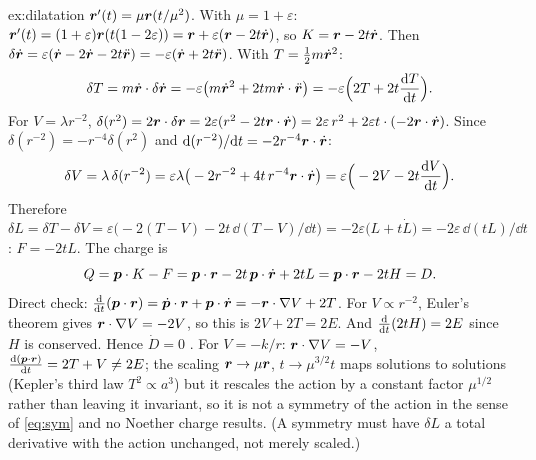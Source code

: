 \documentclass[11pt]{article}
\newcommand{\eps}{\varepsilon}
\begin{document}
\begin{solution}{ex:dilatation}
$\bm{r}'(t)=\mu\bm{r}(t/\mu^2)$. With $\mu=1+\eps$: $\vect r'(t)=(1+\eps)\vect r(t(1-2\eps))=\vect r+\eps(\vect r-2t\dot{\vect r})$, so $K=\bm{r}-2t\dot{\bm{r}}$. Then $\delta\dot{\vect r}=\eps(\dot{\vect r}-2\dot{\vect r}-2t\ddot{\vect r})=-\eps(\dot{\vect r}+2t\ddot{\vect r})$. With $T=\tfrac12m\dot{\bm{r}}^2$:
\begin{equation}
  \delta T=m\dot{\vect r}\cdot\delta\dot{\vect r}=-\eps\big(m\dot{\vect r}^2+2tm\dot{\vect r}\cdot\ddot{\vect r}\big)=-\eps\Big(2T+2t\diff Tt\Big).
\end{equation}
For $V=\lambda r^{-2}$, $\delta(r^2)=2\vect r\cdot\delta\vect r=2\eps(r^2-2t\vect r\cdot\dot{\vect r})=2\eps\,r^2+2\eps t\cdot(-2\vect r\cdot\dot{\vect r})$. Since $\delta(r^{-2})=-r^{-4}\delta(r^2)$ and $\mathrm{d}(r^{-2})/\mathrm{d} t=-2r^{-4}\bm{r}\cdot\dot{\bm{r}}$:
\begin{equation}
  \delta V=\lambda\,\delta(r^{-2})=\eps\lambda\big(-2r^{-2}+4t\,r^{-4}\vect r\cdot\dot{\vect r}\big)=\eps\Big(-2V-2t\diff Vt\Big).
\end{equation}
Therefore $\delta L=\delta T-\delta V=\eps\big(-2(T-V)-2t\,\dd(T-V)/\dd t\big)=-2\eps\big(L+t\dot L\big)=-2\eps\,\dd(tL)/\dd t$: $F=-2tL$. The charge is
\begin{equation}
  Q=\bm{p}\cdot K-F=\bm{p}\cdot\bm{r}-2t\,\bm{p}\cdot\dot{\bm{r}}+2tL=\bm{p}\cdot\bm{r}-2tH=D .
\end{equation}
Direct check: $\frac{\mathrm{d} }{\mathrm{d} t}(\bm{p}\cdot\bm{r})=\dot{\bm{p}}\cdot\bm{r}+\bm{p}\cdot\dot{\bm{r}}=-\bm{r}\cdot\nabla V+2T$. For $V\propto r^{-2}$, Euler's theorem gives $\bm{r}\cdot\nabla V=-2V$, so this is $2V+2T=2E$. And $\frac{\mathrm{d} }{\mathrm{d} t}(2tH)=2E$ since $H$ is conserved. Hence $\dot D=0$ \checkmark. For $V=-k/r$: $\bm{r}\cdot\nabla V=-V$, $\frac{\mathrm{d} (\bm{p}\cdot\bm{r})}{\mathrm{d} t}=2T+V\ne2E$; the scaling $\bm{r}\to\mu\bm{r}$, $t\to\mu^{3/2}t$ maps solutions to solutions (Kepler's third law $T^2\propto a^3$) but it rescales the action by a constant factor $\mu^{1/2}$ rather than leaving it invariant, so it is not a symmetry of the action in the sense of \eqref{eq:sym} and no Noether charge results. (A symmetry must have $\delta L$ a total derivative with the action unchanged, not merely scaled.)
\end{solution}
\end{document}
